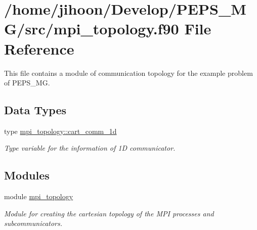 \hypertarget{mpi__topology_8f90}{}\section{/home/jihoon/\+Develop/\+P\+E\+P\+S\+\_\+\+M\+G/src/mpi\+\_\+topology.f90 File Reference}
\label{mpi__topology_8f90}


This file contains a module of communication topology for the example problem of P\+E\+P\+S\+\_\+\+MG.  


\subsection*{Data Types}
\begin{DoxyCompactItemize}
\item 
type \hyperlink{structmpi__topology_1_1cart__comm__1d}{mpi\+\_\+topology\+::cart\+\_\+comm\+\_\+1d}
\begin{DoxyCompactList}\small\item\em Type variable for the information of 1D communicator. \end{DoxyCompactList}\end{DoxyCompactItemize}
\subsection*{Modules}
\begin{DoxyCompactItemize}
\item 
module \hyperlink{namespacempi__topology}{mpi\+\_\+topology}
\begin{DoxyCompactList}\small\item\em Module for creating the cartesian topology of the M\+PI processes and subcommunicators. \end{DoxyCompactList}\end{DoxyCompactItemize}
